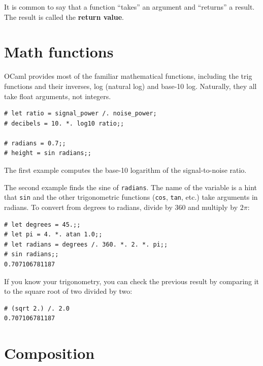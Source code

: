 \documentclass[10pt]{book}
\begin{document}
It is common to say that a function ``takes'' an argument and ``returns''
a result.  The result is called the {\bf return value}.


\section{Math functions}

OCaml provides most of the familiar mathematical functions, including
the trig functions and their inverses, log (natural log) and base-10 log.
Naturally, they all take float arguments, not integers.

\beforeverb
\begin{verbatim}
# let ratio = signal_power /. noise_power;
# decibels = 10. *. log10 ratio;;

# radians = 0.7;;
# height = sin radians;;
\end{verbatim}
\afterverb
%
The first example computes the base-10 logarithm of the
signal-to-noise ratio.


The second example finds the sine of {\tt radians}.  The name of the
variable is a hint that {\tt sin} and the other trigonometric
functions ({\tt cos}, {\tt tan}, etc.)  take arguments in radians. To
convert from degrees to radians, divide by 360 and multiply by $2
\pi$:

\beforeverb
\begin{verbatim}
# let degrees = 45.;;
# let pi = 4. *. atan 1.0;;
# let radians = degrees /. 360. *. 2. *. pi;;
# sin radians;;
0.707106781187
\end{verbatim}
\afterverb
%

If you know
your trigonometry, you can check the previous result by comparing it to
the square root of two divided by two:


\beforeverb
\begin{verbatim}
# (sqrt 2.) /. 2.0
0.707106781187
\end{verbatim}
\afterverb

\section{Composition}
\end{document}
